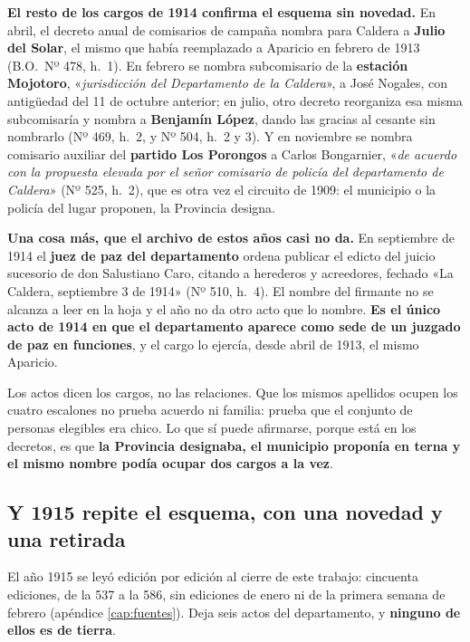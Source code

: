 \textbf{El resto de los cargos de 1914 confirma el esquema sin novedad.} En abril, el decreto
anual de comisarios de campaña nombra para Caldera a \textbf{Julio del Solar}, el mismo que
había reemplazado a Aparicio en febrero de 1913 (B.O.\ Nº 478, h.\ 1). En febrero se nombra
subcomisario de la \textbf{estación Mojotoro}, «\textit{jurisdicción del Departamento de la
Caldera}», a José Nogales, con antigüedad del 11 de octubre anterior; en julio, otro decreto
reorganiza esa misma subcomisaría y nombra a \textbf{Benjamín López}, dando las gracias al
cesante sin nombrarlo (Nº 469, h.\ 2, y Nº 504, h.\ 2 y 3). Y en noviembre se nombra comisario
auxiliar del \textbf{partido Los Porongos} a Carlos Bongarnier, «\textit{de acuerdo con la
propuesta elevada por el señor comisario de policía del departamento de Caldera}» (Nº 525,
h.\ 2), que es otra vez el circuito de 1909: el municipio o la policía del lugar proponen, la
Provincia designa.

\textbf{Una cosa más, que el archivo de estos años casi no da.} En septiembre de 1914 el
\textbf{juez de paz del departamento} ordena publicar el edicto del juicio sucesorio de don
Salustiano Caro, citando a herederos y acreedores, fechado «La Caldera, septiembre 3 de 1914»
(Nº 510, h.\ 4). El nombre del firmante no se alcanza a leer en la hoja y el año no da otro
acto que lo nombre. \textbf{Es el único acto de 1914 en que el departamento aparece como sede
de un juzgado de paz en funciones}, y el cargo lo ejercía, desde abril de 1913, el mismo
Aparicio.

\begin{cautela}
Los actos dicen los cargos, no las relaciones. Que los mismos apellidos ocupen los cuatro
escalones no prueba acuerdo ni familia: prueba que el conjunto de personas elegibles era chico.
Lo que sí puede afirmarse, porque está en los decretos, es que \textbf{la Provincia designaba,
el municipio proponía en terna y el mismo nombre podía ocupar dos cargos a la vez}.
\end{cautela}

\subsection*{Y 1915 repite el esquema, con una novedad y una retirada}

El año 1915 se leyó edición por edición al cierre de este trabajo: cincuenta ediciones,
de la 537 a la 586, sin ediciones de enero ni de la primera
semana de febrero (apéndice \ref{cap:fuentes}). Deja seis actos del departamento, y \textbf{ninguno
de ellos es de tierra}.

